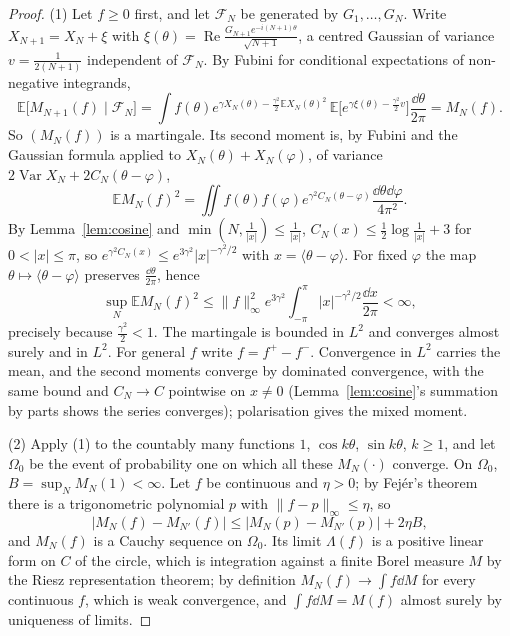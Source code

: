 \begin{proof}
(1) Let $f\ge0$ first, and let $\mathcal F_N$ be generated by $G_1,\dots,G_N$. Write $X_{N+1}=X_N+\xi$ with $\xi(\theta)=\operatorname{Re}\frac{G_{N+1}e^{-i(N+1)\theta}}{\sqrt{N+1}}$, a centred Gaussian of variance $v=\frac1{2(N+1)}$ independent of $\mathcal F_N$. By
Fubini for conditional expectations of non-negative integrands,
\[
\mathbb E\bigl[M_{N+1}(f)\mid\mathcal F_N\bigr]=\int f(\theta)e^{\gamma X_N(\theta)-\frac{\gamma^2}2\mathbb EX_N(\theta)^2}\,\mathbb E\bigl[e^{\gamma\xi(\theta)-\frac{\gamma^2}2v}\bigr]\frac{\dd\theta}{2\pi}=M_N(f).
\]
So $(M_N(f))$ is a martingale. Its second moment is, by Fubini and the Gaussian formula applied to $X_N(\theta)+X_N(\varphi)$, of variance $2\operatorname{Var}X_N+2C_N(\theta-\varphi)$,
\[
\mathbb EM_N(f)^2=\iint f(\theta)f(\varphi)e^{\gamma^2C_N(\theta-\varphi)}\frac{\dd\theta\dd\varphi}{4\pi^2}.
\]
By Lemma~\ref{lem:cosine} and $\min(N,\frac1{|x|})\le\frac1{|x|}$, $C_N(x)\le\frac12\log\frac1{|x|}+3$ for $0<|x|\le\pi$, so $e^{\gamma^2C_N(x)}\le e^{3\gamma^2}|x|^{-\gamma^2/2}$ with $x=\langle\theta-\varphi\rangle$. For fixed $\varphi$ the map $\theta\mapsto\langle\theta-\varphi\rangle$ preserves
$\frac{\dd\theta}{2\pi}$, hence
\[
\sup_N\mathbb EM_N(f)^2\le\|f\|_\infty^2e^{3\gamma^2}\int_{-\pi}^\pi|x|^{-\gamma^2/2}\frac{\dd x}{2\pi}<\infty,
\]
precisely because $\frac{\gamma^2}2<1$. The martingale is bounded in $L^2$ and converges almost surely and in $L^2$. For general $f$ write $f=f^+-f^-$. Convergence in $L^2$ carries the mean, and the second moments converge by
dominated convergence, with the same bound and $C_N\to C$ pointwise on $x\ne0$ (Lemma~\ref{lem:cosine}'s summation by parts shows the series converges); polarisation gives the mixed moment.

(2) Apply (1) to the countably many functions $1$, $\cos k\theta$, $\sin k\theta$, $k\ge1$, and let $\Omega_0$ be the event of probability one on which all these $M_N(\cdot)$ converge. On $\Omega_0$, $B=\sup_NM_N(1)<\infty$. Let $f$ be continuous and
$\eta>0$; by Fej\'er's theorem there is a trigonometric polynomial $p$ with $\|f-p\|_\infty\le\eta$, so
\[
|M_N(f)-M_{N'}(f)|\le|M_N(p)-M_{N'}(p)|+2\eta B,
\]
and $M_N(f)$ is a Cauchy sequence on $\Omega_0$. Its limit $\Lambda(f)$ is a positive linear form on $C$ of the circle, which is integration against a finite Borel measure $M$ by the Riesz representation theorem; by definition
$M_N(f)\to\int f\dd M$ for every continuous $f$, which is weak convergence, and $\int f\dd M=M(f)$ almost surely by uniqueness of limits.
\end{proof}

